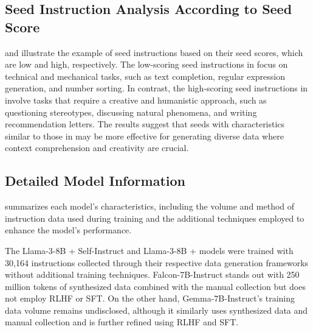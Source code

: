 \subsection{Seed Instruction Analysis According to Seed Score}
 and  illustrate the example of seed instructions 
based on their seed scores, which are low and high, respectively.
The low-scoring seed instructions in  focus on technical and
mechanical tasks, such as text completion, regular expression generation, 
and number sorting. In contrast, the high-scoring seed instructions in 
 involve tasks that require a creative and humanistic approach,
such as questioning stereotypes, discussing natural phenomena, and writing recommendation
letters. The results suggest that seeds with characteristics similar to those in 
may be more effective for generating diverse data where context comprehension and creativity are crucial.

\subsection{Detailed Model Information}

 summarizes each model's characteristics, including
the volume and method of instruction data used during training and the
additional techniques employed to enhance the model's performance. 

The Llama-3-8B + Self-Instruct and Llama-3-8B + \ours{} models 
were trained with 30,164 instructions collected through their respective data generation
frameworks without additional training techniques. Falcon-7B-Instruct stands out
with 250 million tokens of synthesized data combined with the manual collection 
but does not employ RLHF or SFT. On the other hand, Gemma-7B-Instruct's training
data volume remains undisclosed, although it similarly uses synthesized data and
manual collection and is further refined using RLHF and SFT.







